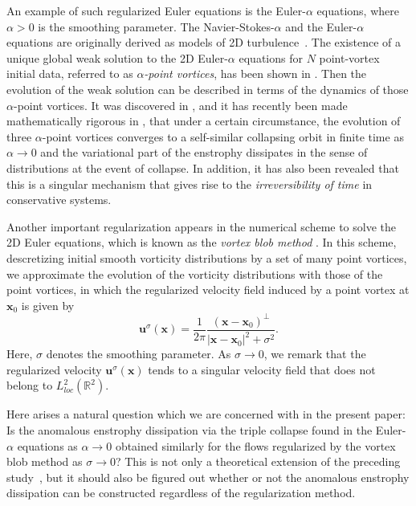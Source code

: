\documentclass{article}
\theoremstyle{definition}
\begin{document}
 An example of such regularized Euler equations is the Euler-$\alpha$ equations, where $\alpha>0$ is the smoothing parameter. The Navier-Stokes-$\alpha$ and the Euler-$\alpha$
 equations are originally derived as models of 2D turbulence~\cite{Foias(a), Lunasin}. The existence of a unique global
 weak solution to the 2D Euler-$\alpha$ equations for $N$ point-vortex initial data, referred to as \textit{$\alpha$-point vortices},
 has been shown in \cite{G.2}. Then the evolution of the weak solution can be described in terms of the dynamics of those $\alpha$-point vortices.
 It was discovered in \cite{Sakajo}, and it has recently been  made mathematically rigorous in \cite{G.2}, that 
 under a certain circumstance, the evolution of three $\alpha$-point vortices converges to a self-similar collapsing orbit in finite time as
 $\alpha \rightarrow 0$ and the variational part of the enstrophy dissipates in the sense of distributions at the event of collapse. In addition, it has also been revealed that
this is a singular mechanism that gives rise to the \textit{irreversibility of time} in conservative systems.
 
 Another important regularization appears in the numerical scheme to solve the 2D Euler equations, which is known as the \textit{vortex blob method} \cite{Anderson, Chorin, Krasny}.
 In this scheme, descretizing initial smooth vorticity distributions by a set of many point vortices, we approximate the evolution of the vorticity distributions
 with those of the point vortices, in which the regularized velocity field induced by a point vortex at ${\bm x}_0$ is given by
 \[
 {\bm u}^{\sigma}({\bm x}) = \frac{1}{2\pi}\frac{({\bm x}-{\bm x}_0)^\perp}{\vert {\bm x}-{\bm x}_0 \vert^2 + \sigma^2}.
\] 
Here, $\sigma$ denotes the smoothing parameter. As $\sigma \rightarrow 0$, we remark that the regularized velocity ${\bm u}^{\sigma}({\bm x})$ tends to a singular
velocity field that does not belong to $L^2_{loc}(\mathbb{R}^2)$. 

 Here arises a natural question which we are concerned with in the present paper: 
 Is the anomalous enstrophy dissipation via the triple collapse found in the Euler-$\alpha$ equations as $\alpha \rightarrow 0$  obtained similarly for 
 the flows regularized by the vortex blob method as $\sigma \rightarrow 0$? This is not only a theoretical
 extension of the preceding study~\cite{G.2}, but it should also be figured out whether or not the anomalous enstrophy dissipation can be constructed
 regardless of the regularization method.
\end{document}
